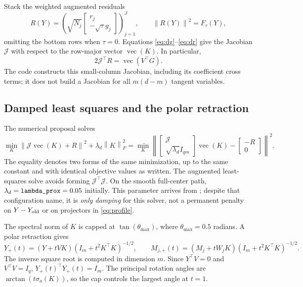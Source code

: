 \documentclass[11pt,a4paper]{article}
\newcommand{\norm}[1]{\left\lVert#1\right\rVert}
\newcommand{\code}[1]{\texttt{\detokenize{#1}}}
\begin{document}
Stack the weighted augmented residuals
\begin{equation}\label{eq:aug-residual}
 R(Y)=\left(\sqrt{N_j}
     \begin{bmatrix}r_j\\-\sqrt\tau g_j\end{bmatrix}\right)_{j=1}^J,
 \qquad \norm{R(Y)}^2=F_\tau(Y),
\end{equation}
omitting the bottom rows when $\tau=0$. Equations \eqref{eq:dg}--\eqref{eq:dr}
give the Jacobian $\mathcal J$ with respect to the row-major vector
$\operatorname{vec}(K)$. In particular,
\begin{equation}\label{eq:jac-gradient}
 2\mathcal J^\top R=\operatorname{vec}(V^\top G).
\end{equation}
The code constructs this small-column Jacobian, including its coefficient
cross terms; it does not build a Jacobian for all $m(d-m)$ tangent variables.

\subsection{Damped least squares and the polar retraction}
The numerical proposal solves
\begin{equation}\label{eq:gn-ls}
 \min_K\norm{\mathcal J\operatorname{vec}(K)+R}^2
       +\lambda_d\norm{K}_F^2
 =\min_K\left\lVert
 \begin{bmatrix}\mathcal J\\\sqrt{\lambda_d}I_{qm}\end{bmatrix}
 \operatorname{vec}(K)-\begin{bmatrix}-R\\0\end{bmatrix}
 \right\rVert^2.
\end{equation}
The equality denotes two forms of the same minimization, up to the same
constant and with identical objective values as written.
The augmented least-squares solve avoids forming
$\mathcal J^\top\mathcal J$. On the smooth full-center path,
$\lambda_d=\code{lambda_prox}=0.05$ initially. This parameter arrives from
\code{ADP_Config.lambda_penalty}; despite that configuration name, it is
\emph{only damping} for this solver, not a permanent penalty on
$Y-Y_{\rm old}$ or on projectors in \eqref{eq:profile}.

The spectral norm of $K$ is capped at $\tan(\theta_{\max})$, where
$\theta_{\max}=0.5$ radians. A polar retraction gives
\begin{equation}\label{eq:polar}
 Y_+(t)=(Y+tVK)(I_m+t^2K^\top K)^{-1/2},\qquad
 M_{j,+}(t)=(M_j+tW_jK)(I_m+t^2K^\top K)^{-1/2}.
\end{equation}
The inverse square root is computed in dimension $m$.
Since $Y^\top V=0$ and $V^\top V=I_q$,
$Y_+(t)^\top Y_+(t)=I_m$. The principal rotation angles are
$\arctan(t\sigma_a(K))$, so the cap controls the largest angle at $t=1$.
\end{document}
